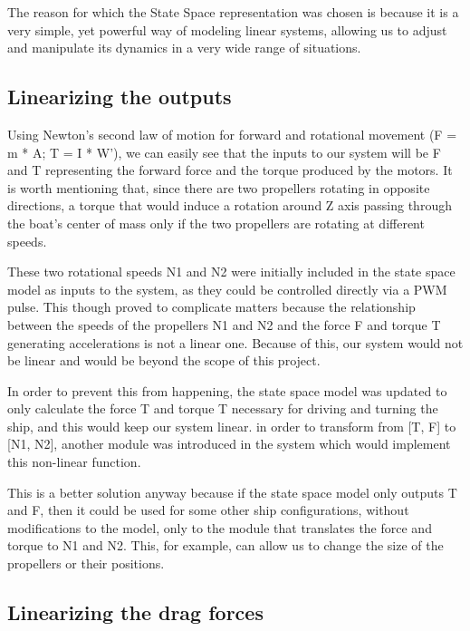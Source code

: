 The reason for which the State Space representation was chosen is because it is a very simple, yet powerful way of modeling linear systems, allowing us to adjust and manipulate its dynamics in a very wide range of situations. 


\subsection{Linearizing the outputs}

Using Newton's second law of motion for forward  and rotational movement (F = m * A; T = I * W'), we can easily see that the inputs to our system will be F and T representing the forward force and the torque produced by the motors. It is worth mentioning that, since there are two propellers rotating in opposite directions, a torque that would induce a rotation around Z axis passing through the boat's center of mass only if the two propellers are rotating at different speeds.

These two rotational speeds N1 and N2 were initially included in the state space model as inputs to the system, as they could be controlled directly via a PWM pulse. This though proved to complicate matters because the relationship between the speeds of the propellers N1 and N2 and the force F and torque T generating accelerations is not a linear one. Because of this, our system would not be linear and would be beyond the scope of this project. 


In order to prevent this from happening, the state space model was updated to only calculate the force T and torque T necessary for driving and turning the ship, and this would keep our system linear. in order to transform from [T, F] to [N1, N2], another module was introduced in the system which would implement this non-linear function. 

This is a better solution anyway because if the state space model only outputs T and F, then it could be used for some other ship configurations, without modifications to the model, only to the module that translates the force and torque to N1 and N2. This, for example, can allow us to change the size of the propellers or their positions.

\subsection{Linearizing the drag forces}
\label{sect:Linearizing drag forces}

